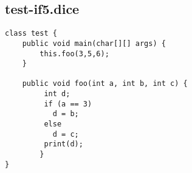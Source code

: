 \subsection{test-if5.dice}
\begin{verbatim}
class test {
	public void main(char[][] args) {
		this.foo(3,5,6);
	}

	public void foo(int a, int b, int c) {
		 int d;
		 if (a == 3)
		   d = b;
		 else
		   d = c;
		 print(d);
		}
}

\end{verbatim}